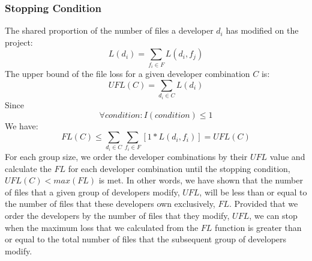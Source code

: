 \documentclass[12pt, a4paper, openright]{report}
\begin{document}
\subsubsection{Stopping Condition}
The shared proportion of the number of files a developer $d_i$ has modified on the project:
\begin{equation} L(d_i) = \sum_{f_i \in F} L(d_{i},f_{j}) \end{equation}
The upper bound of the file loss for a given developer combination $C$ is:
\begin{equation} UFL(C) = \sum_{d_i \in C}L(d_i) \end{equation}
Since \[\forall condition: I(condition) \leq 1 \]
We have:
\begin{equation} FL(C) \leq \sum_{d_i \in C} \sum_{f_i \in F} [1 * L(d_i,f_i)] = UFL(C)\end{equation}
For each group size, we order the developer combinations by their $UFL$ value and calculate the $FL$ for each developer combination until the stopping condition, $UFL(C)<max(FL)$ is met.
In other words, we have shown that the number of files that a given group of developers modify, $UFL$, will be less than or equal to the number of files that these developers own exclusively, $FL$. Provided that we order the developers by the number of files that they modify, $UFL$, we can stop when the maximum loss that we calculated from the $FL$ function is greater than or equal to the total number of files that the subsequent group of developers modify. 
\end{document}
